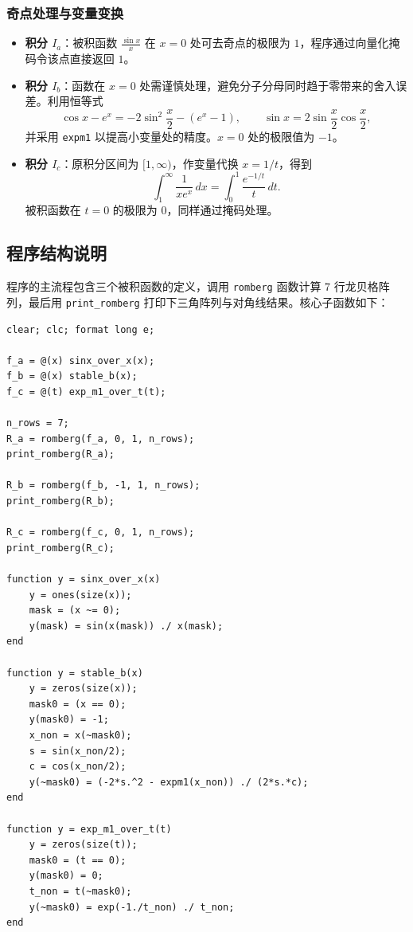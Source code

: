 \documentclass[12pt,a4paper]{article}
\begin{document}
\subsubsection{奇点处理与变量变换}
\begin{itemize}
    \item \textbf{积分 \(I_a\)}：被积函数 \(\frac{\sin x}{x}\) 在 \(x=0\) 处可去奇点的极限为 \(1\)，程序通过向量化掩码令该点直接返回 \(1\)。
    \item \textbf{积分 \(I_b\)}：函数在 \(x=0\) 处需谨慎处理，避免分子分母同时趋于零带来的舍入误差。利用恒等式
    \[
    \cos x - e^x = -2\sin^2\frac{x}{2} - (e^x-1),\qquad \sin x = 2\sin\frac{x}{2}\cos\frac{x}{2},
    \]
    并采用 \texttt{expm1} 以提高小变量处的精度。\(x=0\) 处的极限值为 \(-1\)。
    \item \textbf{积分 \(I_c\)}：原积分区间为 \([1,\infty)\)，作变量代换 \(x = 1/t\)，得到
    \[
    \int_1^\infty \frac{1}{x e^x}\,dx = \int_0^1 \frac{e^{-1/t}}{t}\,dt.
    \]
    被积函数在 \(t=0\) 的极限为 \(0\)，同样通过掩码处理。
\end{itemize}

\subsection{程序结构说明}

程序的主流程包含三个被积函数的定义，调用 \texttt{romberg} 函数计算 7 行龙贝格阵列，最后用 \texttt{print\_romberg} 打印下三角阵列与对角线结果。核心子函数如下：

\begin{lstlisting}[caption={主程序框架及辅助函数}, label={lst:hw8main}]
clear; clc; format long e;

f_a = @(x) sinx_over_x(x);
f_b = @(x) stable_b(x);
f_c = @(t) exp_m1_over_t(t);

n_rows = 7;
R_a = romberg(f_a, 0, 1, n_rows);
print_romberg(R_a);

R_b = romberg(f_b, -1, 1, n_rows);
print_romberg(R_b);

R_c = romberg(f_c, 0, 1, n_rows);
print_romberg(R_c);

function y = sinx_over_x(x)
    y = ones(size(x));
    mask = (x ~= 0);
    y(mask) = sin(x(mask)) ./ x(mask);
end

function y = stable_b(x)
    y = zeros(size(x));
    mask0 = (x == 0);
    y(mask0) = -1;
    x_non = x(~mask0);
    s = sin(x_non/2);
    c = cos(x_non/2);
    y(~mask0) = (-2*s.^2 - expm1(x_non)) ./ (2*s.*c);
end

function y = exp_m1_over_t(t)
    y = zeros(size(t));
    mask0 = (t == 0);
    y(mask0) = 0;
    t_non = t(~mask0);
    y(~mask0) = exp(-1./t_non) ./ t_non;
end
\end{lstlisting}
\end{document}

